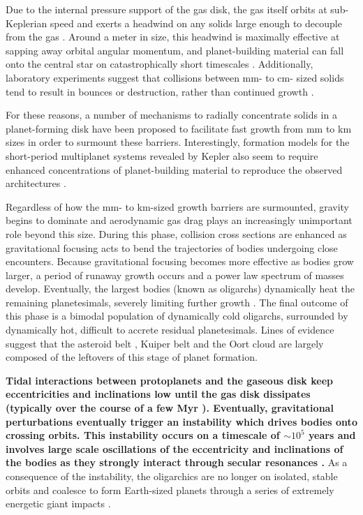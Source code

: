 \documentclass[twocolumn,linenumbers]{aastex63}
\begin{document}
Due to the internal pressure support
of the gas disk, the gas itself orbits at sub-Keplerian speed and
exerts a headwind on any solids large enough to decouple from the gas
\citep{weidenschilling77}. Around a meter in size, this headwind
is maximally effective at sapping away orbital angular momentum, and planet-building material can fall onto the central star on 
catastrophically short timescales \citep{weidenschilling77, nakagawa86}. Additionally, laboratory experiments suggest that 
collisions between mm- to cm- sized solids tend to result in bounces or destruction, rather than continued growth
\citep{blum93, colwell03, beitz11}.

For these reasons, a number of mechanisms to radially concentrate solids in a planet-forming disk have been proposed to 
facilitate fast growth from mm to km sizes \citep{johansen07, lyra08, bai10} in order to surmount these barriers. Interestingly, 
formation models for the short-period multiplanet systems revealed by Kepler \citep{fabrycky14} also seem to require enhanced 
concentrations of planet-building material to reproduce the observed architectures \citep{raymond07, hansen12}.

Regardless of how the mm- to km-sized growth barriers are surmounted, gravity begins to dominate and aerodynamic gas drag 
plays an increasingly unimportant role beyond this size. During this phase, collision cross sections are enhanced as gravitational 
focusing \citep{safronov69} acts to bend the trajectories of bodies undergoing close encounters. Because gravitational focusing 
becomes more effective as bodies grow larger, a period of runaway growth occurs \citep{wetherill89, kokubo96, barnes09} and a 
power law spectrum of masses develop. Eventually, the largest bodies (known as oligarchs) dynamically heat the remaining 
planetesimals, severely limiting further growth \citep{kokubo98}. The final outcome of this phase is a bimodal population of 
dynamically cold oligarchs, surrounded by dynamically hot, difficult to accrete residual planetesimals. Lines of evidence suggest 
that the asteroid belt \textbf{\citep{bottke05, morbidelli09}}, Kuiper belt \textbf{\citep{duncan89, levison08, sheppard10}} and the Oort cloud \textbf{\citep{levison11}} are largely composed of the leftovers of this stage of planet formation.

\textbf{Tidal interactions between protoplanets and the gaseous disk keep eccentricities and inclinations low until the gas disk dissipates (typically over the course of a few Myr \citep{mamajek09}). Eventually, gravitational perturbations eventually trigger an instability which drives bodies onto crossing orbits. This instability occurs on a timescale of $\sim 10^{5}$ years and involves large scale oscillations of the eccentricity and inclinations of the bodies as they strongly interact through secular resonances \citep{chambers98}.}
As a consequence of the instability, the oligarchics are no longer
on isolated, stable orbits and coalesce to form Earth-sized planets
through a series of extremely energetic giant 
impacts \citep{kokubo02, raymond05, raymond06}. 
\end{document}
